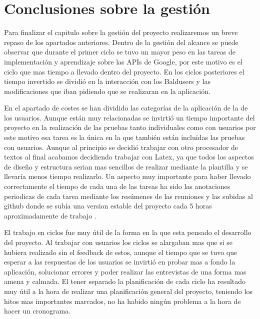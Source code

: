 \section{Conclusiones sobre la gestión}
\label{secc:Conclusiones sobre la gestión}

Para finalizar el capitulo sobre la gestión del proyecto realizaremos un breve repaso de los apartados anteriores. Dentro de la gestión del alcance se puede observar que durante el primer ciclo se tuvo un mayor peso en las tareas de implementación y aprendizaje sobre las APIs de Google, por este motivo es el ciclo que mas tiempo a llevado dentro del proyecto. En los ciclos posteriores el tiempo invertido se dividió en la interacción con los Baldusers y las modificaciones que iban pidiendo que se realizaran en la aplicación.

En el apartado de costes se han dividido las categorías de la aplicación de la de los usuarios. Aunque están muy relacionadas se invirtió un tiempo importante del proyecto en la realización de las pruebas tanto individuales como con usuarios por este motivo esa tarea es la única en la que también están incluidas las pruebas con usuarios.
Aunque al principio se decidió trabajar con otro procesador de textos al final acabamos decidiendo trabajar con Latex, ya que todos los aspectos de diseño y estructura serian mas sencillos de realizar mediante la plantilla y se llevaría menos tiempo realizarlo.
Un aspecto muy importante para haber llevado correctamente el tiempo de cada una de las tareas ha sido las anotaciones periodicas de cada tarea mediante los resúmenes de las reuniones y las subidas al github donde se subía una version estable del proyecto cada 5 horas aproximadamente de trabajo .

El trabajo en ciclos fue muy útil de la forma en la que esta pensado el desarrollo del proyecto. Al trabajar con usuarios los ciclos se alargaban mas que si se hubiera realizado sin el feedback de estos, aunque el tiempo que se tuvo que esperar a las respuestas de los usuarios se invirtió en probar mas a fondo la aplicación, solucionar errores y poder realizar las entrevistas de una forma mas amena y calmada.
El tener separado la planificación de cada ciclo ha resultado muy útil a la hora de realizar una planificación general del proyecto, teniendo los hitos mas importantes marcados, no ha habido ningún problema a la hora de hacer un cronograma.




